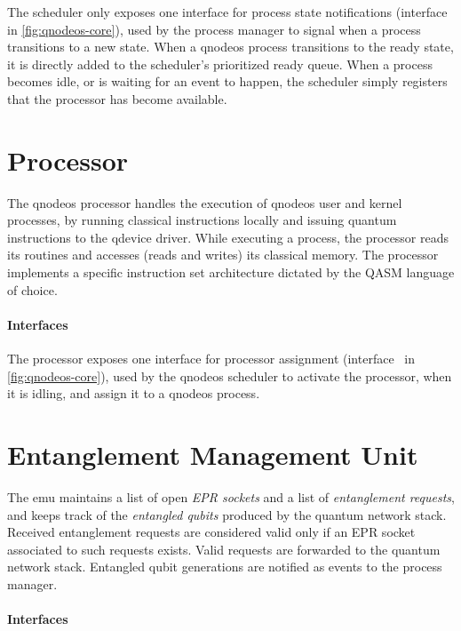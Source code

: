 The scheduler only exposes one interface for process state notifications (interface~ in
\cref{fig:qnodeos-core}), used by the process manager to signal when a process transitions to a new
state. When a \acrshort{qnodeos} process transitions to the ready state, it is directly added to the
scheduler's prioritized ready queue. When a process becomes idle, or is waiting for an event to
happen, the scheduler simply registers that the processor has become available.

\section{Processor}

The \acrshort{qnodeos} processor handles the execution of \acrshort{qnodeos} user and kernel
processes, by running classical instructions locally and issuing quantum instructions to the
\acrshort{qdevice} driver. While executing a process, the processor reads its routines and accesses
(reads and writes) its classical memory. The processor implements a specific instruction set
architecture dictated by the QASM language of choice.

\paragraph{Interfaces}

The processor exposes one interface for processor assignment (interface~ in
\cref{fig:qnodeos-core}), used by the \acrshort{qnodeos} scheduler to activate the processor, when
it is idling, and assign it to a \acrshort{qnodeos} process.

\section{Entanglement Management Unit}

The \acrfull{emu} maintains a list of open \emph{EPR sockets} and a list of \emph{entanglement
requests}, and keeps track of the \emph{entangled qubits} produced by the quantum network stack.
Received entanglement requests are considered valid only if an EPR socket associated to such
requests exists. Valid requests are forwarded to the quantum network stack. Entangled qubit
generations are notified as events to the process manager.

\paragraph{Interfaces}

